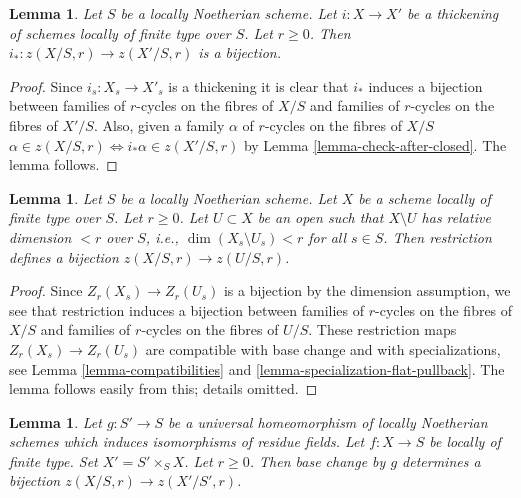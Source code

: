 \documentclass{stacks-project}
\theoremstyle{plain}
\newtheorem{lemma}[subsection]{Lemma}
\theoremstyle{definition}
\theoremstyle{remark}
\numberwithin{equation}{subsection}
\begin{document}
\begin{lemma}
\label{lemma-thickening}
Let $S$ be a locally Noetherian scheme. Let $i : X \to X'$ be a thickening
of schemes locally of finite type over $S$. Let $r \geq 0$.
Then $i_* : z(X/S, r) \to z(X'/S, r)$ is a bijection.
\end{lemma}

\begin{proof}
Since $i_s : X_s \to X'_s$ is a thickening it is clear that $i_*$ induces
a bijection between
families of $r$-cycles on the fibres of $X/S$ and
families of $r$-cycles on the fibres of $X'/S$.
Also, given a family $\alpha$ of $r$-cycles on the fibres of $X/S$
$\alpha \in z(X/S, r) \Leftrightarrow i_*\alpha \in z(X'/S, r)$
by Lemma \ref{lemma-check-after-closed}. The lemma follows.
\end{proof}

\begin{lemma}
\label{lemma-extend-to-larger}
Let $S$ be a locally Noetherian scheme. Let $X$ be a scheme locally
of finite type over $S$. Let $r \geq 0$. Let $U \subset X$ be an open
such that $X \setminus U$ has relative dimension $< r$ over $S$, i.e.,
$\dim(X_s \setminus U_s) < r$ for all $s \in S$. Then
restriction defines a bijection $z(X/S, r) \to z(U/S, r)$.
\end{lemma}

\begin{proof}
Since $Z_r(X_s) \to Z_r(U_s)$ is a bijection by the dimension assumption,
we see that restriction induces a bijection between
families of $r$-cycles on the fibres of $X/S$ and
families of $r$-cycles on the fibres of $U/S$.
These restriction maps $Z_r(X_s) \to Z_r(U_s)$ are
compatible with base change and with specializations, see
Lemma \ref{lemma-compatibilities} and \ref{lemma-specialization-flat-pullback}.
The lemma follows easily from this; details omitted.
\end{proof}

\begin{lemma}
\label{lemma-seminormalize-base}
Let $g : S' \to S$ be a universal homeomorphism of locally Noetherian schemes
which induces isomorphisms of residue fields. Let $f : X \to S$ be locally of
finite type. Set $X' = S' \times_S X$. Let $r \geq 0$. Then base change by $g$
determines a bijection $z(X/S, r) \to z(X'/S', r)$.
\end{lemma}
\end{document}
